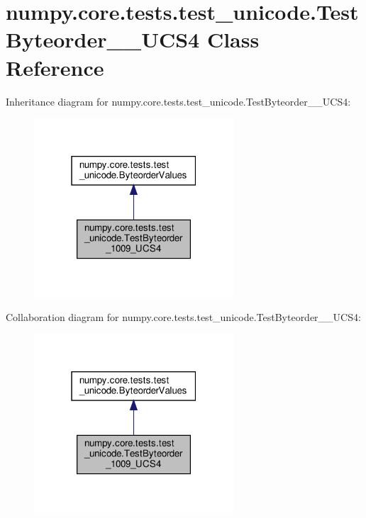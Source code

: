 \hypertarget{classnumpy_1_1core_1_1tests_1_1test__unicode_1_1TestByteorder__1009__UCS4}{}\section{numpy.\+core.\+tests.\+test\+\_\+unicode.\+Test\+Byteorder\+\_\+\_\+\+U\+C\+S4 Class Reference}
\label{classnumpy_1_1core_1_1tests_1_1test__unicode_1_1TestByteorder__1009__UCS4}


Inheritance diagram for numpy.\+core.\+tests.\+test\+\_\+unicode.\+Test\+Byteorder\+\_\+\_\+\+U\+C\+S4\+:
\nopagebreak
\begin{figure}[H]
\begin{center}
\leavevmode
\includegraphics[width=211pt]{classnumpy_1_1core_1_1tests_1_1test__unicode_1_1TestByteorder__1009__UCS4__inherit__graph}
\end{center}
\end{figure}


Collaboration diagram for numpy.\+core.\+tests.\+test\+\_\+unicode.\+Test\+Byteorder\+\_\+\_\+\+U\+C\+S4\+:
\nopagebreak
\begin{figure}[H]
\begin{center}
\leavevmode
\includegraphics[width=211pt]{classnumpy_1_1core_1_1tests_1_1test__unicode_1_1TestByteorder__1009__UCS4__coll__graph}
\end{center}
\end{figure}
